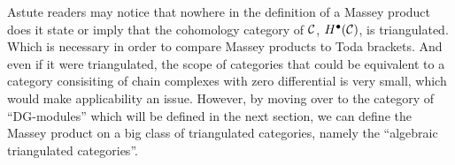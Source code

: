 \begin{remark}
    


\end{remark}

Astute readers may notice that nowhere in the definition of a Massey product does it state or imply that the cohomology category of \( {\mathcal{C}} \), \( H^\bullet({\mathcal{C}}) \), is triangulated. Which is necessary in order to compare Massey products to Toda brackets. And even if it were triangulated, the scope of categories that could be equivalent to a category consisiting of chain complexes with zero differential is very small, which would make applicability an issue. However, by moving over to the category of ``DG-modules'' which will be defined in the next section, we can define the Massey product on a big class of triangulated categories, namely the ``algebraic triangulated categories''.

